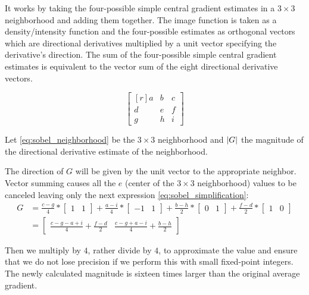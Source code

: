 \documentclass{cslthse-msc}
\DeclarePairedDelimiter\abs{\lvert}{\rvert}%
\begin{document}
It works by taking the four-possible simple central gradient estimates in a $3\times 3$ neighborhood and adding them together. The image function is taken as a density/intensity function and the four-possible estimates as orthogonal vectors which are directional derivatives multiplied by a unit vector specifying the derivative’s direction.  The sum of the four-possible simple central gradient estimates is equivalent to the vector sum of the eight directional derivative vectors.

\begin{equation}
\begin{bmatrix*}[r]\label{eq:sobel_neighborhood}
a & b & c \\
d & e & f \\
g & h & i
\end{bmatrix*}
\end{equation}

Let \ref{eq:sobel_neighborhood} be the $3\times 3$ neighborhood and $\abs*{G}$ the magnitude of the directional derivative estimate of the neighborhood.  

The direction of $G$ will be given by the unit vector to the appropriate neighbor. Vector summing causes all the $e$ (center of the $3\times 3$ neighborhood) values to be canceled leaving only the next expression \ref{eq:sobel_simplification}:
\begin{equation}\label{eq:sobel_simplification}
\begin{split}
	G & =\frac{c-g}{4}*\begin{bmatrix*}1 & 1\end{bmatrix*}+\frac{a-i}{4}*\begin{bmatrix*}-1 & 1\end{bmatrix*}+\frac{b-h}{2}*\begin{bmatrix*}0 & 1\end{bmatrix*}+\frac{f-d}{2}*\begin{bmatrix*}1 & 0\end{bmatrix*} \\ & =\begin{bmatrix*}\frac{c-g-a+i}{4}+\frac{f-d}{2} & \frac{c-g+a-i}{4}+\frac{b-h}{2}\end{bmatrix*}
\end{split}
\end{equation}

Then we multiply by $4$, rather divide by $4$, to approximate the value and ensure that we do not lose precision if we perform this with small fixed-point integers. The newly calculated magnitude is sixteen times larger than the original average gradient.
\end{document}
